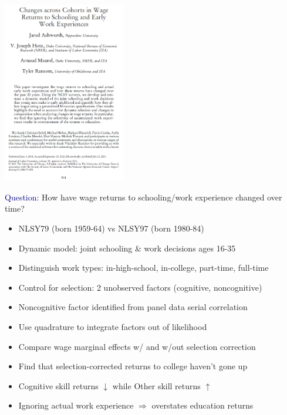 \documentclass[aspectratio=169]{beamer}
\begin{document}
\begin{frame}
\centering
\includegraphics[width=0.4\textwidth]{Ashworth_al_2021_JOLE.jpg}
\end{frame}


\begin{frame}
\textcolor{navy}{Question:} How have wage returns to schooling/work experience changed over time?
\bigskip

\begin{itemize}
\itemsep1.5em
\item<2-> NLSY79 (born 1959-64) vs NLSY97 (born 1980-84)
\item<3-> Dynamic model: joint schooling \& work decisions ages 16-35
\item<4-> Distinguish work types: in-high-school, in-college, part-time, full-time
\item<5-> Control for selection: 2 unobserved factors (cognitive, noncognitive)
\item<6-> Noncognitive factor identified from panel data serial correlation
\end{itemize}
\end{frame}

\begin{frame}
\begin{itemize}
\itemsep1.5em
\item<1-> Use quadrature to integrate factors out of likelihood
\item<2-> Compare wage marginal effects w/ and w/out selection correction
\item<3-> Find that selection-corrected returns to college haven't gone up
\item<4-> Cognitive skill returns $\downarrow$ while Other skill returns $\uparrow$
\item<5-> Ignoring actual work experience $\Rightarrow$ overstates education returns
\end{itemize}
\end{frame}
\end{document}
